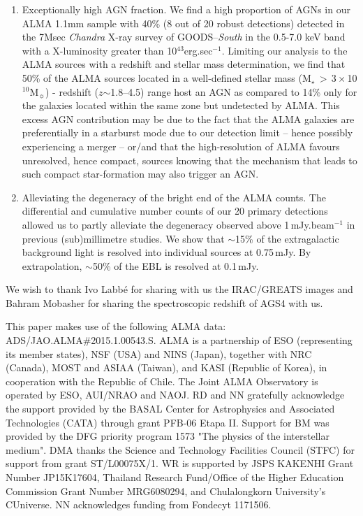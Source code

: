 \documentclass[longauth]{aa}
\begin{document}
\begin{enumerate}
\item Exceptionally high AGN fraction. We find a high proportion of AGNs in our ALMA 1.1mm sample with 40\% (8 out of 20 robust detections) detected in the 7Msec \textit{Chandra} X-ray survey of GOODS--\textit{South} in the 0.5-7.0 keV band with a X-luminosity greater than 10$^{43}$erg.sec$^{-1}$. Limiting our analysis to the ALMA sources with a redshift and stellar mass determination, we find that 50\% of the ALMA sources located in a well-defined stellar mass (M$_{\star}$$\,>\,$3\,$\times$\,10$^{10}$M$_{\sun}$) - redshift ($z$$\sim$1.8--4.5) range host an AGN as compared to 14\% only for the galaxies located within the same zone but undetected by ALMA.
This excess AGN contribution may be due to the fact that the ALMA galaxies are preferentially in a starburst mode due to our detection limit -- hence possibly experiencing a merger -- or/and that the high-resolution of ALMA favours unresolved, hence compact, sources knowing that the mechanism that leads to such compact star-formation may also trigger an AGN.

\item Alleviating the degeneracy of the bright end of the ALMA counts. The differential and cumulative number counts of our 20 primary detections allowed us to partly alleviate the degeneracy observed above 1\,mJy.beam$^{-1}$ in previous (sub)millimetre studies. We show that $\sim$15\% of the extragalactic background light is resolved into individual sources at 0.75\,mJy. By extrapolation, $\sim$50\% of the EBL is resolved at 0.1\,mJy.
\end{enumerate}

\begin{acknowledgements}
We wish to thank Ivo Labb\'{e} for sharing with us the IRAC/GREATS images and Bahram Mobasher for sharing the spectroscopic redshift of AGS4 with us.

This paper makes use of the following ALMA data: ADS/JAO.ALMA\#2015.1.00543.S. ALMA is a partnership of ESO (representing its member states), NSF (USA) and NINS (Japan), together with NRC (Canada), MOST and ASIAA (Taiwan), and KASI (Republic of Korea), in cooperation with the Republic of Chile. The Joint ALMA Observatory is operated by ESO, AUI/NRAO and NAOJ. RD and NN gratefully acknowledge the support provided by the BASAL Center for Astrophysics and Associated Technologies (CATA) through grant PFB-06 Etapa II. Support for BM was provided by the DFG priority program 1573 "The physics of the interstellar medium". DMA thanks the Science and Technology Facilities Council (STFC) for support from grant ST/L00075X/1. WR is supported by JSPS KAKENHI Grant Number JP15K17604, Thailand Research Fund/Office of the Higher Education Commission Grant Number MRG6080294, and Chulalongkorn University's CUniverse. NN acknowledges funding from Fondecyt 1171506.
\end{acknowledgements}



\end{document}
